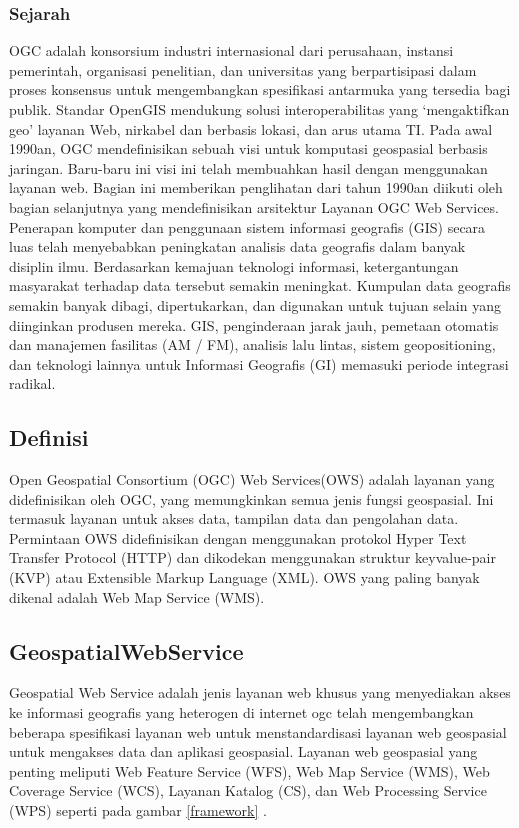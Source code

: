 \subsubsection{Sejarah}
OGC adalah konsorsium industri internasional dari perusahaan, instansi pemerintah, organisasi penelitian, 
dan universitas yang berpartisipasi dalam proses konsensus untuk mengembangkan spesifikasi antarmuka yang tersedia bagi publik. 
Standar OpenGIS mendukung solusi interoperabilitas yang `mengaktifkan geo' layanan Web, nirkabel dan berbasis lokasi, dan arus utama TI. 
Pada awal 1990an, OGC mendefinisikan sebuah visi untuk komputasi geospasial berbasis jaringan. 
Baru-baru ini visi ini telah membuahkan hasil dengan menggunakan layanan web. 
Bagian ini memberikan penglihatan dari tahun 1990an diikuti oleh bagian selanjutnya yang mendefinisikan arsitektur Layanan OGC Web Services. Penerapan komputer dan penggunaan sistem informasi geografis (GIS) secara luas telah menyebabkan peningkatan analisis data geografis dalam banyak disiplin ilmu. Berdasarkan kemajuan teknologi informasi, ketergantungan masyarakat terhadap data tersebut semakin meningkat. Kumpulan data geografis semakin banyak dibagi, dipertukarkan, dan digunakan untuk tujuan
selain yang diinginkan produsen mereka. GIS, penginderaan jarak jauh, pemetaan otomatis dan manajemen fasilitas (AM / FM), 
analisis lalu lintas, sistem geopositioning, dan teknologi lainnya untuk Informasi Geografis (GI) memasuki periode integrasi radikal\cite{lupp2008open}.

\subsection{Definisi}
Open Geospatial Consortium (OGC) Web Services(OWS) adalah layanan yang didefinisikan oleh OGC, 
yang memungkinkan semua jenis fungsi geospasial. 
Ini termasuk layanan untuk akses data, tampilan data dan pengolahan data. 
Permintaan OWS didefinisikan dengan menggunakan protokol Hyper Text Transfer Protocol (HTTP) 
dan dikodekan menggunakan struktur keyvalue-pair (KVP) atau Extensible Markup Language (XML). 
OWS yang paling banyak dikenal adalah Web Map Service (WMS). \cite{lupp2008open} 

\subsection{GeospatialWebService}
Geospatial Web Service adalah jenis layanan web khusus yang menyediakan akses ke informasi geografis yang heterogen di internet ogc telah mengembangkan beberapa
spesifikasi layanan web untuk menstandardisasi layanan web geospasial untuk mengakses data dan aplikasi geospasial. 
Layanan web geospasial yang penting meliputi Web Feature Service (WFS), Web Map Service (WMS), Web Coverage Service (WCS), 
Layanan Katalog (CS), dan Web Processing Service (WPS) seperti pada gambar \ref{framework} \cite{lupp2008open}.

